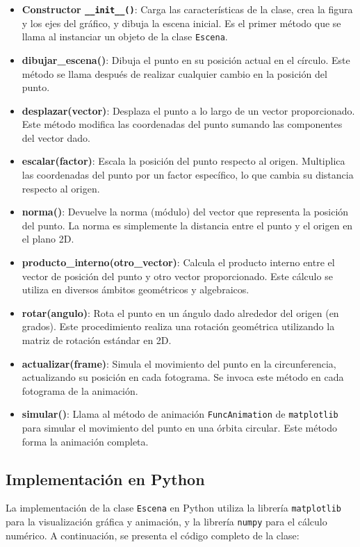 \begin{itemize}
\item \textbf{Constructor \texttt{__init__()}}: Carga las características de la clase, crea la figura y los ejes del gráfico, y dibuja la escena inicial. Es el primer método que se llama al instanciar un objeto de la clase \texttt{Escena}.
\item \textbf{dibujar\_escena()}: Dibuja el punto en su posición actual en el círculo. Este método se llama después de realizar cualquier cambio en la posición del punto.
\item \textbf{desplazar(vector)}: Desplaza el punto a lo largo de un vector proporcionado. Este método modifica las coordenadas del punto sumando las componentes del vector dado.
\item \textbf{escalar(factor)}: Escala la posición del punto respecto al origen. Multiplica las coordenadas del punto por un factor específico, lo que cambia su distancia respecto al origen.
\item \textbf{norma()}: Devuelve la norma (módulo) del vector que representa la posición del punto. La norma es simplemente la distancia entre el punto y el origen en el plano 2D.
\item \textbf{producto\_interno(otro\_vector)}: Calcula el producto interno entre el vector de posición del punto y otro vector proporcionado. Este cálculo se utiliza en diversos ámbitos geométricos y algebraicos.
\item \textbf{rotar(angulo)}: Rota el punto en un ángulo dado alrededor del origen (en grados). Este procedimiento realiza una rotación geométrica utilizando la matriz de rotación estándar en 2D.
\item \textbf{actualizar(frame)}: Simula el movimiento del punto en la circunferencia, actualizando su posición en cada fotograma. Se invoca este método en cada fotograma de la animación.
\item \textbf{simular()}: Llama al método de animación \texttt{FuncAnimation} de \texttt{matplotlib} para simular el movimiento del punto en una órbita circular. Este método forma la animación completa.
\end{itemize}

\subsection{Implementación en Python}
La implementación de la clase \texttt{Escena} en Python utiliza la librería \texttt{matplotlib} para la visualización gráfica y animación, y la librería \texttt{numpy} para el cálculo numérico. A continuación, se presenta el código completo de la clase:

